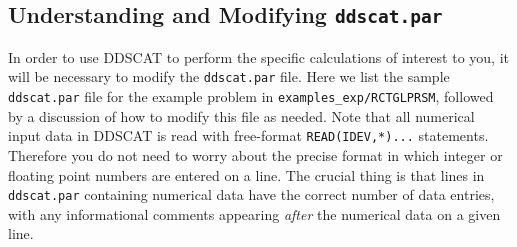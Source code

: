 \begin{appendix}
\section{Understanding and Modifying {\tt ddscat.par}\label{app:ddscat.par}}

In order to use DDSCAT to perform the specific calculations of interest to
you, it will be necessary to modify the {\tt ddscat.par} file.  
Here we list the sample {\tt ddscat.par} file for the example problem in
{\tt examples\_exp/RCTGLPRSM}, followed by a discussion of
how to modify this file as needed.
Note that all numerical input data in DDSCAT is read with free-format 
{\tt READ(IDEV,*)...} statements.  
Therefore you do not need to worry about the precise format in which integer 
or floating point numbers are entered on a line.
The crucial thing is that lines in {\tt ddscat.par} containing numerical 
data have the correct number of data entries, with any informational 
comments appearing {\it after} the numerical data on a given line.


\end{appendix}
